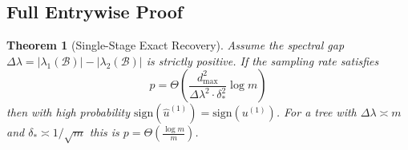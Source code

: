 \documentclass[11pt]{article}
\newtheorem{theorem}{Theorem}
\begin{document}
\subsection{Full Entrywise Proof}

\begin{theorem}[Single-Stage Exact Recovery]
\label{thm:recovery}
Assume the spectral gap $\Delta\lambda = |\lambda_1(\mathcal{B})| - |\lambda_2(\mathcal{B})|$ is strictly positive. If the sampling rate satisfies
\begin{equation}
p = \Theta\left(\frac{d_{\max}^2}{\Delta\lambda^2 \cdot \delta_*^2} \log m\right)
\end{equation}
then with high probability $\text{sign}(\hat{u}^{(1)}) = \text{sign}(u^{(1)})$. For a tree with $\Delta\lambda \asymp m$ and $\delta_* \asymp 1/\sqrt{m}$ this is $p = \Theta(\frac{\log m}{m})$.
\end{theorem}
\end{document}
